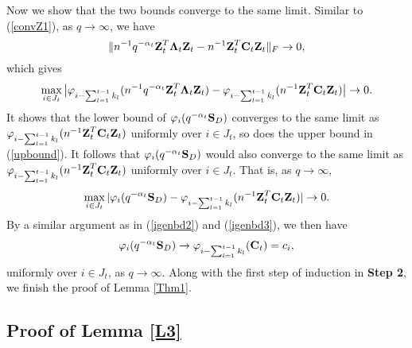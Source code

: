 \documentclass{statsoc}
\newcommand{\bC}{\mbox{\bf C}}
\newcommand{\bS}{\mbox{\bf S}}
\newcommand{\bZ}{\mbox{\bf Z}}
\newcommand{\bLambda}{\mbox{\boldmath $\Lambda$}}
\def\t{^T}
\begin{document}
Now we show that the two bounds converge to the same limit. Similar to (\ref{convZ1}), as $q \to \infty$, we have
\[\|n^{-1}q^{-\alpha_t} \bZ_t\t \bLambda_t \bZ_t - n^{-1} \bZ_t\t \bC_t \bZ_t\|_F \to 0,\]
which gives
\[\max_{i \in J_t} \big|\varphi_{i - \sum_{l = 1}^{t - 1} k_l}(n^{-1}q^{-\alpha_t} \bZ_t\t \bLambda_t \bZ_t) - \varphi_{i - \sum_{l = 1}^{t - 1} k_l}(n^{-1} \bZ_t\t \bC_t \bZ_t)\big| \to 0.\]
It shows that the lower bound of $\varphi_i(q^{-\alpha_t} \bS_D)$ converges to the same limit as $\varphi_{i - \sum_{l = 1}^{t - 1} k_l}(n^{-1}\bZ_t\t\bC_t \bZ_t)$ uniformly over $i \in J_t$, so does the upper bound in (\ref{upbound}). It follows that $\varphi_i(q^{-\alpha_t}\bS_D)$ would also converge to the same limit as $\varphi_{i - \sum_{l = 1}^{t - 1} k_l}(n^{-1}\bZ_t\t\bC_t \bZ_t)$ uniformly over $i \in J_t$. That is, as $q \to \infty$,
\begin{align*}
\max_{i \in J_t}|\varphi_i(q^{-\alpha_t}\bS_D) - \varphi_{i - \sum_{l = 1}^{t - 1} k_l}(n^{-1}\bZ_t\t\bC_t \bZ_t)| \to 0.
\end{align*}
By a similar argument as in (\ref{igenbd2}) and (\ref{igenbd3}), we then have
\begin{align*}
\varphi_i(q^{-\alpha_t}\bS_D) \to \varphi_{i - \sum_{l = 1}^{t - 1} k_l}(\bC_t) = c_i,
\end{align*}
uniformly over $i \in J_t$, as $q \to \infty$. Along with the first step of induction in \textbf{Step 2}, we finish the proof of Lemma \ref{Thm1}.




\subsection{Proof of Lemma \ref{L3}}

\smallskip
\end{document}
